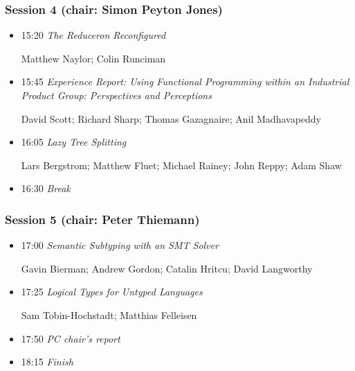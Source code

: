 \documentclass{article}[10pt]
\newenvironment{tightItemize}{
\begin{itemize}
  \setlength{\itemsep}{1pt}
  \setlength{\parskip}{0pt}
  \setlength{\parsep}{0pt}}{\end{itemize}
}
\newcommand{\session}[1]{\subsubsection*{#1}}
\begin{document}
          \session{Session 4 (chair: Simon Peyton Jones)}

          \begin{tightItemize}
            \item[15:20]\textit{The Reduceron Reconfigured}

            Matthew Naylor; Colin Runciman
            
            \item[15:45]\textit{Experience Report: Using Functional
            Programming within an Industrial Product Group:
            Perspectives and Perceptions}

            David Scott; Richard Sharp; Thomas Gazagnaire; Anil Madhavapeddy 
            
            \item[16:05]\textit{Lazy Tree Splitting}

            Lars Bergstrom; Matthew Fluet; Michael Rainey; John Reppy; Adam Shaw

            \item[16:30]\textit{Break}
          \end{tightItemize}

          \session{Session 5 (chair: Peter Thiemann)}

          \begin{tightItemize}
            \item[17:00]\textit{Semantic Subtyping with an SMT Solver}

          Gavin Bierman; Andrew Gordon; Catalin Hritcu; David Langworthy

            \item[17:25]\textit{Logical Types for Untyped Languages}

            Sam Tobin-Hochstadt; Matthias Felleisen 

            \item[17:50]\textit{PC chair's report}

            \item[18:15]\textit{Finish}
          \end{tightItemize}

\end{document}
